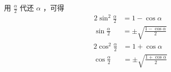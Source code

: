用 $\frac{\alpha}{2}$ 代还 $\alpha$ ，可得
\begin{equation}
\begin{aligned}
2\sin^2\frac{\alpha}{2} &= 1 - \cos\alpha\\
\sin\frac{\alpha}{2}&= \pm\sqrt{\frac{1-\cos\alpha}{2}}
\end{aligned}
\end{equation}
\begin{equation}
\begin{aligned}
2\cos^2\frac{\alpha}{2} &= 1 + \cos\alpha\\
\cos\frac{\alpha}{2} &= \pm\sqrt{\frac{1+\cos\alpha}{2}}
\end{aligned}
\end{equation}
